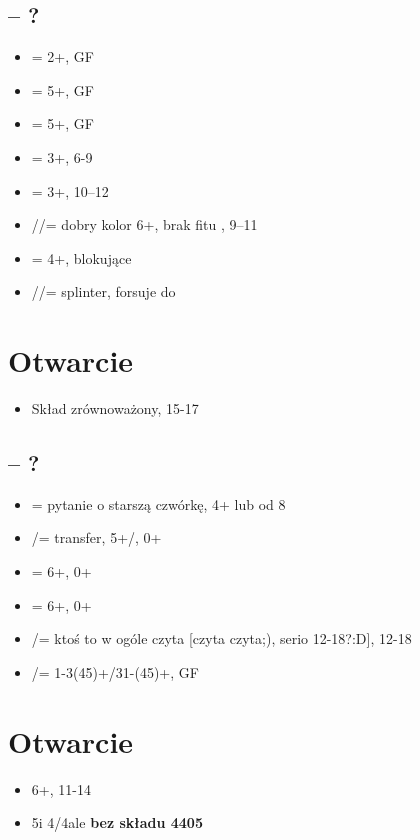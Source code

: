 \documentclass[12pt]{article}
\begin{document}
\subsection{\texorpdfstring{\Ss[1] – ?}{1S – ?}}
\begin{itemize}
    \item \Cs[2] = 2+\Cs, GF
    \item \Ds[2] = 5+\Ds, GF
    \item \Hs[2] = 5+\Hs, GF
    \item \Ss[2] = 3+\Ss, 6-9 
    \item \NT[2] = 3+\Ss, 10–12
    \item \Cs[3]/\Ds/\Hs[] = dobry kolor 6+, brak fitu \Ss, 9–11
    \item \Ss[3] = 4+\Ss, blokujące
    \item \Cs[4]/\Ds/\Hs[] = splinter, forsuje do \Ss[4]
\end{itemize}

\newpage
\section{Otwarcie \texorpdfstring{\NT[1]}{1NT}}
\begin{itemize}
    \item Skład zrównoważony, 15-17
\end{itemize}
\subsection{\texorpdfstring{\NT[1] – ?}{1NT – ?}}
\begin{itemize}
    \item \Cs[2] = pytanie o starszą czwórkę, 4+ lub od 8
    \item \Ds[2]/\Hs[] = transfer, 5+\Hs/\Ss, 0+
    \item \Ss[2] = 6+\Cs, 0+
    \item \NT[2] = 6+\Ds, 0+
    \item \Cs[3]/\Ds[] = ktoś to w ogóle czyta [czyta czyta;), serio 12-18?:D], 12-18 
    \item \Hs[3]/\Ss[] = 1-3(45)+/31-(45)+, GF
\end{itemize}

\newpage
\section{Otwarcie \texorpdfstring{\Cs[2]}{2C}}
\begin{itemize}
    \item 6+\Cs, 11-14
    \item 5\Cs[] i 4\Hs/4\Ss[] ale \textbf{bez składu 4405}
\end{itemize}
\end{document}
